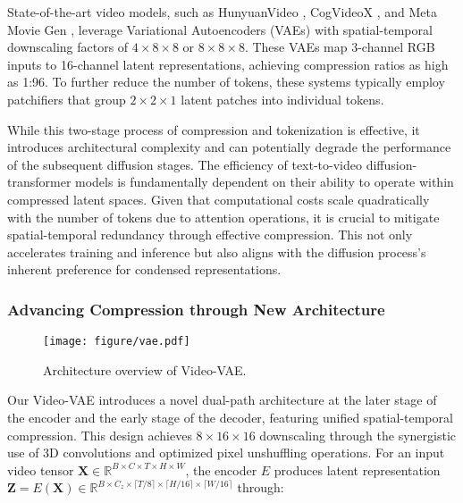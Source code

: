 State-of-the-art video models, such as HunyuanVideo \citep{kong2024hunyuanvideo}, CogVideoX \citep{yang2024cogvideox}, and Meta Movie Gen \citep{polyak2024moviegencastmedia}, leverage Variational Autoencoders (VAEs) with spatial-temporal downscaling factors of $4{\times}8{\times}8$ or $8{\times}8{\times}8$. These VAEs map 3-channel RGB inputs to 16-channel latent representations, achieving compression ratios as high as 1:96. To further reduce the number of tokens, these systems typically employ patchifiers that group $2{\times}2{\times}1$ latent patches into individual tokens. 

While this two-stage process of compression and tokenization is effective, it introduces architectural complexity and can potentially degrade the performance of the subsequent diffusion stages. The efficiency of text-to-video diffusion-transformer models is fundamentally dependent on their ability to operate within compressed latent spaces. Given that computational costs scale quadratically with the number of tokens due to attention operations, it is crucial to mitigate spatial-temporal redundancy through effective compression. This not only accelerates training and inference but also aligns with the diffusion process's inherent preference for condensed representations.

\subsubsection{Advancing Compression through New Architecture}
\begin{figure*}[t]
    \centering
    \texttt{[image: figure/vae.pdf]}
    \caption{Architecture overview of Video-VAE.}
    \label{fig:vae}
\end{figure*}

Our Video-VAE introduces a novel dual-path architecture at the later stage of the encoder and the early stage of the decoder, featuring unified spatial-temporal compression. This design achieves $8{\times}16{\times}16$ downscaling through the synergistic use of 3D convolutions and optimized pixel unshuffling operations.
For an input video tensor $\mathbf{X} \in \mathbb{R}^{B \times C \times T \times H \times W}$, the encoder $E$ produces latent representation $\mathbf{Z} = E(\mathbf{X}) \in \mathbb{R}^{B \times C_z \times \lceil T/8 \rceil \times \lceil H/16 \rceil \times \lceil W/16 \rceil}$ through:

